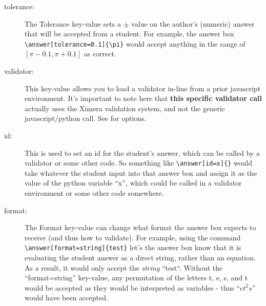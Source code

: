 \documentclass{ximera}
\begin{document}
        \begin{description}
            \item[tolerance:] The Tolerance key-value sets a $\pm$ value on the author's (numeric) answer that will be accepted from a student. For example, the answer box \verb|\answer[tolerance=0.1]{\pi}| would accept anything in the range of $[\pi-0.1,\pi+0.1]$ as correct. %
            
            \item[validator:] This key-value allows you to load a validator in-line from a prior javascript environment. It's important to note here that \textbf{this specific validator call} actually uses the Ximera validation system, and not the generic javascript/python call.  
            See  for options. 
            
            
            \item[id:] This is used to set an id for the student's answer, which can be called by a validator or some other code. So something like \verb|\answer[id=x]{}| would take whatever the student input into that answer box and assign it as the value of the python variable ``x'', which could be called in a validator environment or some other code somewhere. %
            
            \item[format:] The Format key-value can change what format the answer box expects to receive (and thus how to validate). For example, using the command \verb|\answer[format=string]{test}| let's the answer box know that it is evaluating the student answer as a direct string, rather than an equation. As a result, it would only accept the \textit{string} ``test``. Without the ``format=string'' key-value, any permutation of the letters t, e, s, and t would be accepted as they would be interpreted as variables - thus ``$et^2s$'' would have been accepted. 
            
        \end{description}
    
\end{document}
